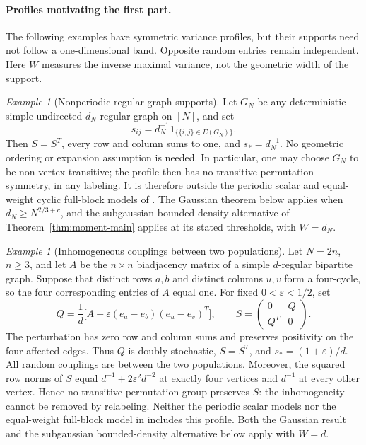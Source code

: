 \documentclass[11pt,reqno]{amsart}
\numberwithin{equation}{section}
\theoremstyle{plain}
\theoremstyle{definition}
\theoremstyle{remark}
\newtheorem{example}[theorem]{Example}
\begin{document}
\paragraph{Profiles motivating the first part.}
The following examples have symmetric variance profiles, but their
supports need not follow a one-dimensional band. Opposite random entries
remain independent. Here $W$ measures the inverse maximal variance,
not the geometric width of the support.

\begin{example}[Nonperiodic regular-graph supports]\label{ex:regular-graph}
Let $G_N$ be any deterministic simple undirected $d_N$-regular graph on
$[N]$, and set
\[
 s_{ij}=d_N^{-1}\mathbf1_{\{\{i,j\}\in E(G_N)\}}.
\]
Then $S=S^T$, every row and column sums to one, and $s_*=d_N^{-1}$.
No geometric ordering or expansion assumption is needed. In particular,
one may choose $G_N$ to be non-vertex-transitive; the profile then has no
transitive permutation symmetry, in any labeling. It is therefore
outside the periodic scalar and equal-weight cyclic full-block models
of \cite[Section~2]{han2026optimal}. The Gaussian theorem below applies
when $d_N\ge N^{2/3+c}$, and the subgaussian bounded-density alternative
of Theorem~\ref{thm:moment-main} applies at its stated thresholds,
with $W=d_N$.
\end{example}

\begin{example}[Inhomogeneous couplings between two populations]
\label{ex:bipartite-profile}
Let $N=2n$, $n\ge3$, and let $A$ be the $n\times n$ biadjacency matrix
of a simple $d$-regular bipartite graph. Suppose that distinct rows
$a,b$ and distinct columns $u,v$ form a four-cycle, so the four
corresponding entries of $A$ equal one. For fixed $0<\varepsilon<1/2$, set
\[
 Q=\frac1d\bigl[A+\varepsilon(e_a-e_b)(e_u-e_v)^T\bigr],
 \qquad
 S=\begin{pmatrix}0&Q\\Q^T&0\end{pmatrix}.
\]
The perturbation has zero row and column sums and preserves positivity
on the four affected edges. Thus $Q$ is doubly stochastic, $S=S^T$,
and $s_*=(1+\varepsilon)/d$. All random couplings are between the two
populations. Moreover, the squared row norms of $S$ equal
$d^{-1}+2\varepsilon^2d^{-2}$ at exactly four vertices and $d^{-1}$
at every other vertex. Hence no transitive permutation group preserves
$S$: the inhomogeneity cannot be removed by relabeling. Neither the
periodic scalar models nor the equal-weight full-block model in
\cite{han2026optimal} includes this profile. Both the Gaussian result
and the subgaussian bounded-density alternative below apply with $W=d$.
\end{example}
\end{document}
